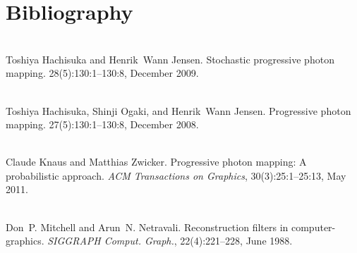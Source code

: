 \chapter{Bibliography}
\hypertarget{citelist}{}\label{citelist}

\begin{DoxyDescription}
\item[\label{citelist_CITEREF_Hachisuka:2009:Stochastic}%
\Hypertarget{citelist_CITEREF_Hachisuka:2009:Stochastic}%
\mbox{[}1\mbox{]}]\hfill \\
Toshiya Hachisuka and Henrik~Wann Jensen. Stochastic progressive photon mapping. 28(5)\+:130\+:1--130\+:8, December 2009. 


\item[\label{citelist_CITEREF_Hachisuka:2008:Progressive}%
\Hypertarget{citelist_CITEREF_Hachisuka:2008:Progressive}%
\mbox{[}2\mbox{]}]\hfill \\
Toshiya Hachisuka, Shinji Ogaki, and Henrik~Wann Jensen. Progressive photon mapping. 27(5)\+:130\+:1--130\+:8, December 2008. 


\item[\label{citelist_CITEREF_Knaus:2011:Progressive}%
\Hypertarget{citelist_CITEREF_Knaus:2011:Progressive}%
\mbox{[}3\mbox{]}]\hfill \\
Claude Knaus and Matthias Zwicker. Progressive photon mapping\+: A probabilistic approach. {\itshape ACM Transactions on Graphics}, 30(3)\+:25\+:1--25\+:13, May 2011. 


\item[\label{citelist_CITEREF_Mitchell:1988:Reconstruction}%
\Hypertarget{citelist_CITEREF_Mitchell:1988:Reconstruction}%
\mbox{[}4\mbox{]}]\hfill \\
Don~P. Mitchell and Arun~N. Netravali. Reconstruction filters in computer-\/graphics. {\itshape SIGGRAPH Comput. Graph.}, 22(4)\+:221--228, June 1988. 


\end{DoxyDescription}